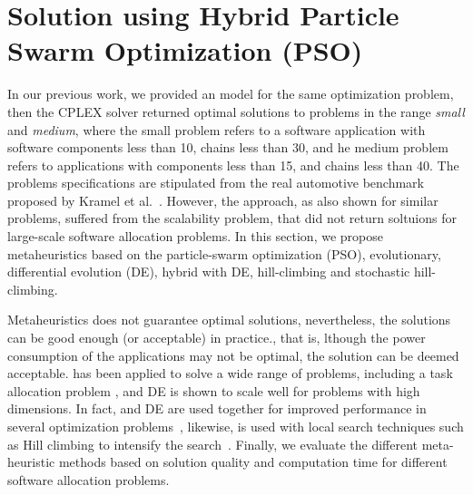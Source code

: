\section{Solution using Hybrid Particle Swarm Optimization (PSO)}\label{sec_solution}
In our previous work, we provided an \ilp{} model for the same optimization problem, then the CPLEX solver returned optimal solutions to problems in the range \textit{small} and \textit{medium}, where the small problem refers to a software application with software components less than 10, chains less than 30, and he medium problem refers to applications with components less than 15, and chains less than 40. The problems specifications are stipulated from the real automotive benchmark proposed by Kramel et al.~\cite{Kramer2015RealFree}. However, the \ilp{} approach, as also shown for similar problems, suffered from the scalability problem, that did not return soltuions for large-scale software allocation problems. In this section, we propose metaheuristics based on the particle-swarm optimization (PSO), evolutionary, differential evolution (DE), hybrid \pso{} with DE,  hill-climbing and stochastic hill-climbing. 

Metaheuristics does not guarantee optimal solutions, nevertheless, the solutions can be good enough (or acceptable) in practice., that is, lthough the power consumption of the applications may not be optimal, the solution can be deemed acceptable. \pso{} has been applied to solve a wide range of problems, including a task allocation problem \cite{yin2007task}, and DE is shown to scale well for problems with high dimensions. In fact, \pso{} and DE are used together for improved performance in several optimization problems~\cite{Sengupta2018ParticlePerspectives,Mirjalili2019ParticleOptimisation}, likewise, \pso{} is used with local search techniques such as Hill climbing to intensify the search~\cite{yin2007task}. Finally, we evaluate the different meta-heuristic methods based on solution quality and computation time for different software allocation problems.

